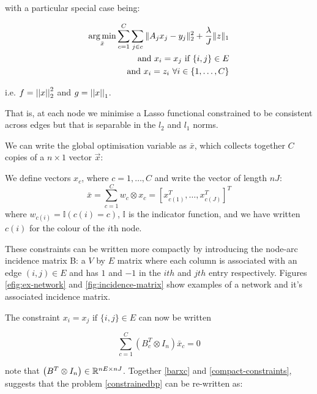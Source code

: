 \documentclass{article}
\begin{document}
with a particular special case being:

\begin{align}
\operatorname*{arg\,min}_{\bar{x}} \sum_{c=1}^C \sum_{j \in c} \|A_jx_j - y_j\|_2^2 + \frac{\lambda}{J}\|z\|_1 \nonumber \\ 
\text{ and } x_i = x_j \text{ if } \{i,j\} \in E \nonumber \\
\text{ and } x_i = z_i \text{ } \forall i \in \{1, \ldots, C\}
\label{constrainedbp}
\end{align}

i.e. \(f = \left|\left|x\right|\right|_2^2\) and \(g = \left|\left|x\right|\right|_1\).

That is, at each node we minimise a Lasso functional constrained to be consistent across edges but that is separable in the \(l_2\) and \(l_1\) norms.

We can write the global optimisation variable as \(\bar{x}\), which collects together \(C\) copies of a \(n\times 1\) vector \(\vec{x}\):

\begin{defn}
We define vectors \(x_c\), where \(c = 1,\ldots , C\) and write the vector of length \(nJ\):
\begin{equation}
\bar{x} = \sum_{c=1}^C w_c \otimes x_c = \left[x_{c(1)}^T, \ldots	, x_{c(J)}^T\right]^T
\label{barxc}
\end{equation}
where \(w_{c(i)} = \mathbb{I}(c(i) = c)\), \(\mathbb{I}\) is the indicator function, and we have written \(c(i)\) for the colour of the \(i\)th node.
\end{defn}

These constraints can be written more compactly by introducing the node-arc incidence matrix B: a \(V\) by \(E\) matrix where each column is associated with an edge \(\left(i,j\right) \in E\) and has \(1\) and \(-1\) in the \(ith\) and \(jth\) entry respectively. Figures \eqref{efig:ex-network} and \eqref{fig:incidence-matrix} show examples of a network and it's associated incidence matrix.

The constraint \(x_i = x_j \text{ if } \{i,j\} \in E \) can now be written 

\begin{equation}
\sum_{c=1}^C\left(B_c^T \otimes I_n\right)\bar{x}_c = 0
\label{compact-constraints}
\end{equation}

note that \(\left(B^T\otimes I_n \right) \in {\mathbb{R}}^{nE \times nJ}\). Together \eqref{barxc} and \eqref{compact-constraints}, suggests that the problem \eqref{constrainedbp} can be re-written as:
\end{document}
